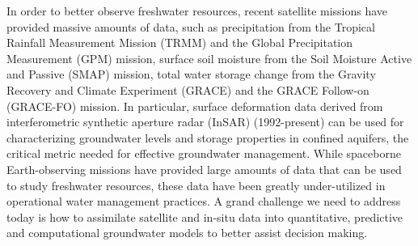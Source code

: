 In order to better observe freshwater resources, recent satellite missions have provided massive amounts of data, such as precipitation from the Tropical Rainfall Measurement Mission (TRMM) and the Global Precipitation Measurement (GPM) mission, surface soil moisture from the Soil Moisture Active and Passive (SMAP) mission, total water storage change from the Gravity Recovery and Climate Experiment (GRACE) and the GRACE Follow-on (GRACE-FO) mission. In particular, surface deformation data derived from interferometric synthetic aperture radar (InSAR) (1992-present) can be used for characterizing groundwater levels and storage properties in confined aquifers, the critical metric needed for effective groundwater management. While spaceborne Earth-observing missions have provided large amounts of data that can be used to study freshwater resources, these data have been greatly under-utilized in operational water management practices. A grand challenge we need to address today is how to assimilate satellite and in-situ data into quantitative, predictive and computational groundwater models to better assist decision making.

% 